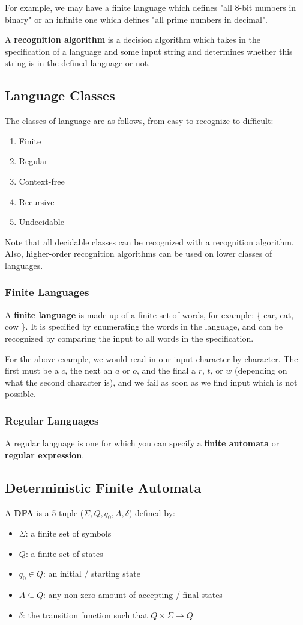 \documentclass[12pt]{article}
\begin{document}
For example, we may have a finite language which defines "all 8-bit numbers in binary" or an infinite one which defines "all prime numbers in decimal".

A {\bf recognition algorithm} is a decision algorithm which takes in the specification of a language and some input string and determines whether this string is in the defined language or not.

\subsection*{Language Classes}
The classes of language are as follows, from easy to recognize to difficult:
\begin{enumerate}
\item Finite
\item Regular
\item Context-free
\item Recursive
\item Undecidable
\end{enumerate}

Note that all decidable classes can be recognized with a recognition algorithm. Also, higher-order recognition algorithms can be used on lower classes of languages.

\subsubsection*{Finite Languages}
A {\bf finite language} is made up of a finite set of words, for example: \{ car, cat, cow \}. It is specified by enumerating the words in the language, and can be recognized by comparing the input to all words in the specification.

For the above example, we would read in our input character by character. The first must be a $c$, the next an $a$ or $o$, and the final a $r$, $t$, or $w$ (depending on what the second character is), and we fail as soon as we find input which is not possible.

\subsubsection*{Regular Languages}
A regular language is one for which you can specify a {\bf finite automata} or {\bf regular expression}.

\subsection*{Deterministic Finite Automata}
A {\bf DFA} is a 5-tuple ($\Sigma, Q, q_0, A, \delta$) defined by:
\begin{itemize}
\item $\Sigma$: a finite set of symbols
\item $Q$: a finite set of states
\item $q_0 \in Q$: an initial / starting state
\item $A \subseteq Q$: any non-zero amount of accepting / final states
\item $\delta$: the transition function such that $Q \times \Sigma \rightarrow Q$
\end{itemize}
\end{document}
